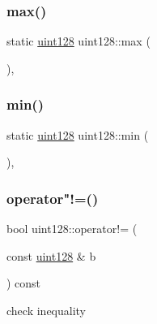 \mbox{\label{classuint128_a8fc47c78cb71d012c6208c150ca4cf3b}} 
\subsubsection{\texorpdfstring{max()}{max()}}
{\footnotesize\ttfamily static \hyperlink{classuint128}{uint128} uint128\+::max (\begin{DoxyParamCaption}{ }\end{DoxyParamCaption})\hspace{0.3cm}{\ttfamily [inline]}, {\ttfamily [static]}}

\mbox{\label{classuint128_a4d43d35f5576c480e4fc1cb63fbfaf78}} 
\subsubsection{\texorpdfstring{min()}{min()}}
{\footnotesize\ttfamily static \hyperlink{classuint128}{uint128} uint128\+::min (\begin{DoxyParamCaption}{ }\end{DoxyParamCaption})\hspace{0.3cm}{\ttfamily [inline]}, {\ttfamily [static]}}

\mbox{\label{classuint128_a767bfa81f69c7884cbb9434c37435e50}} 
\subsubsection{\texorpdfstring{operator"!=()}{operator!=()}}
{\footnotesize\ttfamily bool uint128\+::operator!= (\begin{DoxyParamCaption}\item[{const \hyperlink{classuint128}{uint128} \&}]{b }\end{DoxyParamCaption}) const\hspace{0.3cm}{\ttfamily [inline]}}



check inequality 

\mbox{\label{classuint128_a227d131e34d73974124c38cfbf0c6cc4}} 
